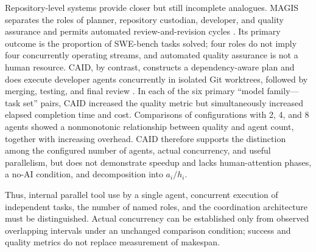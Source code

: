 Repository-level systems provide closer but still incomplete analogues. MAGIS
separates the roles of planner, repository custodian, developer, and quality
assurance and permits automated review-and-revision cycles \cite{tao2024magis}.
Its primary outcome is the proportion of SWE-bench tasks solved; four roles do
not imply four concurrently operating streams, and automated quality assurance
is not a human resource. CAID, by contrast, constructs a dependency-aware plan
and does execute developer agents concurrently in isolated Git worktrees,
followed by merging, testing, and final review \cite{geng2026caid}. In each of
the six primary ``model family---task set'' pairs, CAID increased the quality
metric but simultaneously increased elapsed completion time and cost.
Comparisons of configurations with 2, 4, and 8 agents showed a nonmonotonic
relationship between quality and agent count, together with increasing
overhead. CAID therefore supports the distinction among the configured number
of agents, actual concurrency, and useful parallelism, but does not demonstrate
speedup and lacks human-attention phases, a no-AI condition, and decomposition
into $a_i/h_i$.

Thus, internal parallel tool use by a single agent, concurrent execution of
independent tasks, the number of named roles, and the coordination architecture
must be distinguished. Actual concurrency can be established only from observed
overlapping intervals under an unchanged comparison condition; success and
quality metrics do not replace measurement of makespan.
